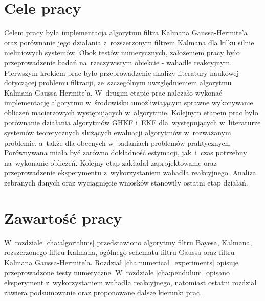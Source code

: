 \section{Cele pracy}
\label{sec:thesis_goals}
Celem pracy była implementacja algorytmu filtra Kalmana Gaussa-Hermite'a oraz porównanie jego działania z~rozszerzonym filtrem Kalmana dla kilku silnie nieliniowych systemów. Obok testów numerycznych, założeniem pracy było przeprowadzenie badań na~rzeczywistym obiekcie - wahadle reakcyjnym. Pierwszym krokiem prac było przeprowadzenie analizy literatury naukowej dotyczącej problemu filtracji, ze~szczególnym uwzględnieniem algorytmu Kalmana Gaussa-Hermite'a. W~drugim etapie prac należało wykonać implementację algorytmu w~środowisku umożliwiającym sprawne wykonywanie obliczeń macierzowych występujących w~algorytmie. Kolejnym etapem prac było porównanie działania algorytmów GHKF i~EKF dla~występujących w~literaturze systemów teoretycznych służących ewaluacji algorytmów w~rozważanym problemie, a~także dla obecnych w~badaniach problemów praktycznych. Porównywana miała być zarówno dokładność estymacji, jak~i~czas potrzebny na~wykonanie obliczeń. Kolejny etap zakładał zaprojektowanie oraz przeprowadzenie eksperymentu z~wykorzystaniem wahadła reakcyjnego. Analiza zebranych danych oraz wyciągnięcie wniosków stanowiły ostatni etap działań.

\section{Zawartość pracy}
\label{sec:thesis_content}
W~rozdziale \ref{cha:algorithms} przedstawiono algorytmy filtru Bayesa, Kalmana, rozszerzonego filtru Kalmana, ogólnego schematu filtru Gaussa oraz filtru Kalmana Gaussa-Hermite'a. Rozdział \ref{cha:numerical_experiments} opisuje przeprowadzone testy numeryczne. W~rozdziale \ref{cha:pendulum} opisano eksperyment z~wykorzystaniem wahadła reakcyjnego, natomiast ostatni rozdział zawiera podsumowanie oraz proponowane dalsze kierunki prac.